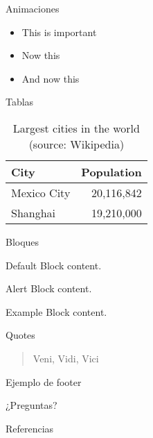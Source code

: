 \begin{frame}{Animaciones}
    \begin{itemize}[<+- | alert@+>]
        \item \alert<4>{This is important}
        \item Now this
        \item And now this
    \end{itemize}
\end{frame}

\begin{frame}{Tablas}
    \begin{table}
        \caption{Largest cities in the world (source: Wikipedia)}
        \begin{tabular}{lr}
            \toprule
            City & Population\\
            \midrule
            Mexico City & 20,116,842\\
            Shanghai & 19,210,000\\
            \bottomrule
        \end{tabular}
    \end{table}
\end{frame}

\begin{frame}{Bloques}
    \begin{block}{Default}
        Block content.
    \end{block}

    \begin{alertblock}{Alert}
        Block content.
    \end{alertblock}


    \begin{exampleblock}{Example}
        Block content.
    \end{exampleblock}
\end{frame}

\begin{frame}{Quotes}
    \begin{quote}
        Veni, Vidi, Vici
    \end{quote}
\end{frame}

{%
\begin{frame}{Ejemplo de footer}
\end{frame}
}

\begin{frame}[standout]
  ¿Preguntas?
\end{frame}

\begin{frame}[allowframebreaks]{Referencias}
    \nocite{...}

  
  
\end{frame}
